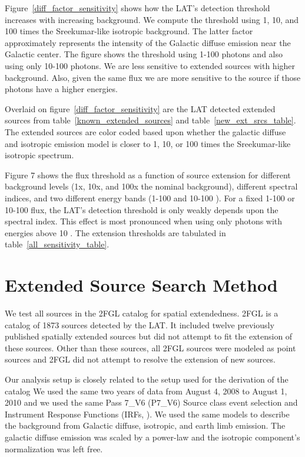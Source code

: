 \documentclass[12pt,preprint]{aastex}
\newcommand{\gev}{\text{GeV}\xspace}
\begin{document}
Figure~\ref{diff_factor_sensitivity} shows how the LAT's detection
threshold increases with increasing background. We compute the threshold
using 1, 10, and 100 times the Sreekumar-like isotropic background. The
latter factor approximately represents the intensity of the Galactic
diffuse emission near the Galactic center.  The figure shows the threshold
using 1-100 \gev photons and also
using only 10-100 \gev photons. We
are less sensitive to extended sources with higher background. Also,
given the same flux we are more sensitive to the source if those
photons have a higher energies.

Overlaid on figure~\ref{diff_factor_sensitivity} are the LAT
detected extended sources from table~\ref{known_extended_sources} and
table~\ref{new_ext_srcs_table}.  The extended sources are color coded
based upon whether the galactic diffuse and isotropic emission model is
closer to 1, 10, or 100 times the Sreekumar-like isotropic spectrum.

Figure 7 shows the flux threshold as a function of source extension for
different background levels (1x, 10x, and 100x the
nominal background), different spectral indices, and two
different energy bands (1-100 \gev and 10-100 \gev).
For a fixed 1-100 \gev or 10-100 \gev
flux, the LAT's detection threshold is only weakly depends upon the
spectral index.  This effect is most pronounced when using only photons
with energies above 10 \gev. The extension thresholds are tabulated in
table~\ref{all_sensitivity_table}.

\section{Extended Source Search Method}

We test all sources in the 2FGL catalog for spatial extendedness.
2FGL is a catalog of 1873 sources detected by the LAT.  It included
twelve previously published spatially extended sources but did not
attempt to fit the extension of these sources. Other than these sources,
all 2FGL sources were modeled as point sources and 2FGL did not attempt
to resolve the extension of new sources.

Our analysis setup is closely related to the setup used for the
derivation of the catalog We used the same two years of data from August
4, 2008 to August 1, 2010 and we used the same Pass 7\_V6 (P7\_V6)
Source class event selection and Instrument Response Functions (IRFs,
\cite{lat_on_orbit_psf}).  We used the same models to describe the
background from Galactic diffuse, isotropic, and earth limb emission.
The galactic diffuse emission was scaled by a power-law and the isotropic
component's normalization was left free.
\end{document}
